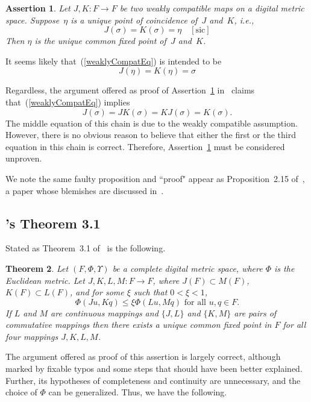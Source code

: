 \documentclass{article}
\newtheorem{thm}{Theorem}
\newtheorem{assert}[thm]{Assertion}
\numberwithin{thm}{section}
\begin{document}
\begin{assert}
    \label{SalJhade22-2.15}
    Let $J,K: F \to F$ be two
    weakly compatible maps
on a digital metric space. Suppose~$\eta$
is a unique point of coincidence 
of~$J$ and~$K$, i.e.,
\begin{equation}
\label{weaklyCompatEq}
J(\sigma)=K(\sigma)=\eta \mbox{~~~}
[\mbox{sic}]
\end{equation}
Then $\eta$ is the unique common 
fixed point of~$J$ and~$K$.
\end{assert}

It seems likely that~(\ref{weaklyCompatEq}) is
intended to be
\[ J(\eta)=K(\eta)= \sigma
\]

Regardless, the argument offered
as proof of 
Assertion~\ref{SalJhade22-2.15}
in~\cite{SalJhade22} claims
that~(\ref{weaklyCompatEq}) implies
\[ J(\sigma) = JK(\sigma) =
KJ(\sigma) = K(\sigma). \]
The middle equation
of this chain is due
to the weakly 
compatible assumption.
However, there is no obvious reason
to believe that either the first or
the third equation in this chain
is correct. Therefore,
Assertion~\ref{SalJhade22-2.15}
must be considered unproven.

We note the same
faulty proposition and ``proof"
appear as Proposition~2.15
of~\cite{SalJhade23}, a paper whose
blemishes are discussed
in~\cite{BxBad7}.

\subsection{\cite{SalJhade22}'s
Theorem 3.1}
Stated as Theorem~3.1
of~\cite{SalJhade22}
is the following.
\begin{thm}
    \label{SalJhade3.1}
    Let $(F,\Phi,\Upsilon)$
    be a complete digital
    metric space, where
    $\Phi$ is the 
    Euclidean metric. Let
    $J,K,L,M: F \to F$,
    where $J(F) \subset M(F)$, 
    $K(F) \subset L(F)$, and for some $\xi$
    such that $0 < \xi < 1$,
    \[ \Phi(Ju,Kq) \le
       \xi \Phi(Lu,Mq) 
       \mbox{ for all } u,q \in F.
    \]
 If $L$ and $M$ are continuous mappings 
 and $\{J,L\}$ and $\{K, M\}$ are pairs
of commutative mappings then there exists a unique common fixed point
in $F$ for all four mappings $J, K, L, M$.
\end{thm}

The argument offered as
proof of this assertion
is largely correct, although
marked by fixable typos and
some steps that should have
been better explained. Further,
its hypotheses of completeness and 
continuity are
unnecessary, and the
choice of $\Phi$ can be
generalized. Thus, we have the
following.
\end{document}
